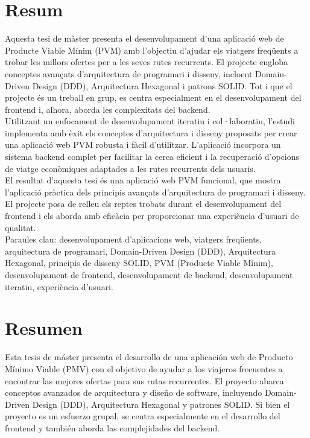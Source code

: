 \documentclass[a4paper, 11pt, oneside]{book}
\begin{document}
\section*{Resum}
Aquesta tesi de màster presenta el desenvolupament d'una aplicació web de
Producte Viable Mínim (PVM) amb l'objectiu d'ajudar els viatgers freqüents a
trobar les millors ofertes per a les seves rutes recurrents. El projecte engloba
conceptes avançats d'arquitectura de programari i disseny, incloent
Domain-Driven Design (DDD), Arquitectura Hexagonal i patrons SOLID. Tot i que el
projecte és un treball en grup, es centra especialment en el desenvolupament del
frontend i, alhora, aborda les complexitats del backend.
\\[8pt]
Utilitzant un enfocament de desenvolupament iteratiu i col·laboratiu, l'estudi
implementa amb èxit els conceptes d'arquitectura i disseny proposats per crear
una aplicació web PVM robusta i fàcil d'utilitzar. L'aplicació incorpora un
sistema backend complet per facilitar la cerca eficient i la recuperació
d'opcions de viatge econòmiques adaptades a les rutes recurrents dels usuaris.
\\[8pt]
El resultat d'aquesta tesi és una aplicació web PVM funcional, que mostra
l'aplicació pràctica dels principis avançats d'arquitectura de programari i
disseny. El projecte posa de relleu els reptes trobats durant el desenvolupament
del frontend i els aborda amb eficàcia per proporcionar una experiència d'usuari
de qualitat.
\\[16pt]
Paraules clau: desenvolupament d'aplicacions web, viatgers freqüents,
arquitectura de programari, Domain-Driven Design (DDD), Arquitectura Hexagonal,
principis de disseny SOLID, PVM (Producte Viable Mínim), desenvolupament de
frontend, desenvolupament de backend, desenvolupament iteratiu, experiència
d'usuari.
\newpage
\section*{Resumen}
Esta tesis de máster presenta el desarrollo de una aplicación web de Producto
Mínimo Viable (PMV) con el objetivo de ayudar a los viajeros frecuentes a
encontrar las mejores ofertas para sus rutas recurrentes. El proyecto abarca
conceptos avanzados de arquitectura y diseño de software, incluyendo
Domain-Driven Design (DDD), Arquitectura Hexagonal y patrones SOLID. Si bien el
proyecto es un esfuerzo grupal, se centra especialmente en el desarrollo del
frontend y también aborda las complejidades del backend.
\end{document}

